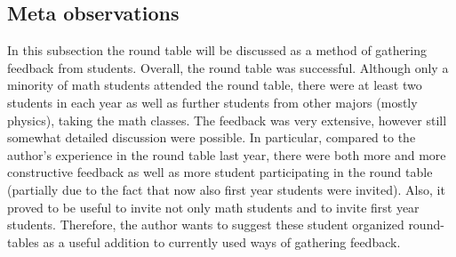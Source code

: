 \subsection{Meta observations}
\label{sec-1-4}
\label{subsec:meta}
In this subsection the round table will be discussed as a method of gathering feedback from students.
Overall, the round table was successful. Although only a minority of math students attended the round table, 
there were at least two students in each year as well as further students from other majors (mostly physics), taking the math classes. 
The feedback was very extensive, however still somewhat detailed discussion were possible. 
In particular, compared to the author's experience in the round table last year, 
there were both more and more constructive feedback as well as more student participating in the round table (partially due to the fact that now also first year students were invited).
Also, it proved to be useful to invite not only math students and to invite first year students. 
Therefore, the author wants to suggest these student organized round-tables as a useful addition to currently used ways of gathering feedback.
